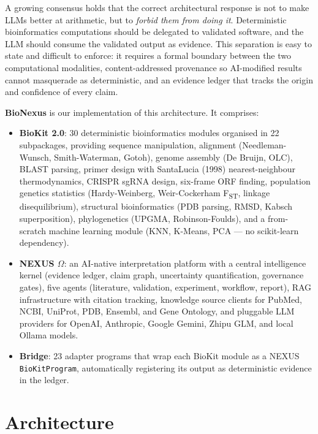 \documentclass[11pt,a4paper]{article}
\begin{document}
A growing consensus holds that the correct architectural response is not
to make LLMs better at arithmetic, but to \emph{forbid them from doing it}.
Deterministic bioinformatics computations should be delegated to validated
software, and the LLM should consume the validated output as evidence. This
separation is easy to state and difficult to enforce: it requires a formal
boundary between the two computational modalities, content-addressed
provenance so AI-modified results cannot masquerade as deterministic, and
an evidence ledger that tracks the origin and confidence of every claim.

\textbf{BioNexus} is our implementation of this architecture. It comprises:

\begin{itemize}
  \item \textbf{BioKit 2.0}: 30 deterministic bioinformatics modules
        organised in 22 subpackages, providing sequence manipulation,
        alignment (Needleman-Wunsch, Smith-Waterman, Gotoh), genome
        assembly (De Bruijn, OLC), BLAST parsing, primer design with
        SantaLucia (1998) nearest-neighbour thermodynamics, CRISPR sgRNA
        design, six-frame ORF finding, population genetics statistics
        (Hardy-Weinberg, Weir-Cockerham F\textsubscript{ST}, linkage
        disequilibrium), structural bioinformatics (PDB parsing, RMSD,
        Kabsch superposition), phylogenetics (UPGMA, Robinson-Foulds),
        and a from-scratch machine learning module (KNN, K-Means, PCA ---
        no scikit-learn dependency).
  \item \textbf{NEXUS $\Omega$}: an AI-native interpretation platform with
        a central intelligence kernel (evidence ledger, claim graph,
        uncertainty quantification, governance gates), five agents
        (literature, validation, experiment, workflow, report), RAG
        infrastructure with citation tracking, knowledge source clients
        for PubMed, NCBI, UniProt, PDB, Ensembl, and Gene Ontology,
        and pluggable LLM providers for OpenAI, Anthropic, Google Gemini,
        Zhipu GLM, and local Ollama models.
  \item \textbf{Bridge}: 23 adapter programs that wrap each BioKit module
        as a NEXUS \texttt{BioKitProgram}, automatically registering its
        output as deterministic evidence in the ledger.
\end{itemize}

\section{Architecture}
\end{document}
